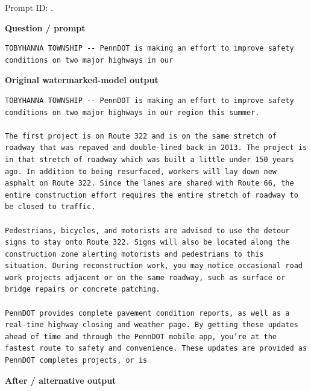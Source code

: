 Prompt ID:
\texttt{}.

\textbf{Question / prompt}

\begin{Verbatim}
TOBYHANNA TOWNSHIP -- PennDOT is making an effort to improve safety conditions on two major highways in our
\end{Verbatim}

\textbf{Original watermarked-model output}

\begin{Verbatim}
TOBYHANNA TOWNSHIP -- PennDOT is making an effort to improve safety conditions on two major highways in our region this summer.

The first project is on Route 322 and is on the same stretch of roadway that was repaved and double-lined back in 2013. The project is in that stretch of roadway which was built a little under 150 years ago. In addition to being resurfaced, workers will lay down new asphalt on Route 322. Since the lanes are shared with Route 66, the entire construction effort requires the entire stretch of roadway to be closed to traffic.

Pedestrians, bicycles, and motorists are advised to use the detour signs to stay onto Route 322. Signs will also be located along the construction zone alerting motorists and pedestrians to this situation. During reconstruction work, you may notice occasional road work projects adjacent or on the same roadway, such as surface or bridge repairs or concrete patching.

PennDOT provides complete pavement condition reports, as well as a real-time highway closing and weather page. By getting these updates ahead of time and through the PennDOT mobile app, you’re at the fastest route to safety and convenience. These updates are provided as PennDOT completes projects, or is
\end{Verbatim}

\textbf{After / alternative output}

